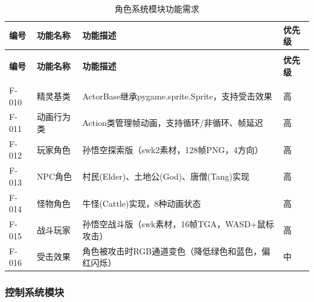 \documentclass[12pt,a4paper]{article}
\begin{document}
\begin{longtable}{>{\centering\arraybackslash}m{1.5cm}>{\centering\arraybackslash}m{2.5cm}>{\centering\arraybackslash}m{6cm}>{\centering\arraybackslash}m{1.5cm}}
\caption{角色系统模块功能需求} \label{tab:f_actor} \\
\toprule
\textbf{编号} & \textbf{功能名称} & \textbf{功能描述} & \textbf{优先级} \\
\midrule
\endfirsthead

\toprule
\multicolumn{4}{l}{续表} \\
\textbf{编号} & \textbf{功能名称} & \textbf{功能描述} & \textbf{优先级} \\
\midrule
\endhead

\midrule
\multicolumn{4}{r}{续下页} \\
\endfoot

\bottomrule
\endlastfoot

F-010 & 精灵基类 & ActorBase继承pygame.sprite.Sprite，支持受击效果 & 高 \\
F-011 & 动画行为类 & Action类管理帧动画，支持循环/非循环、帧延迟 & 高 \\
F-012 & 玩家角色 & 孙悟空探索版（swk2素材，128帧PNG，4方向） & 高 \\
F-013 & NPC角色 & 村民(Elder)、土地公(God)、唐僧(Tang)实现 & 高 \\
F-014 & 怪物角色 & 牛怪(Cattle)实现，8种动画状态 & 高 \\
F-015 & 战斗玩家 & 孙悟空战斗版（swk素材，16帧TGA，WASD+鼠标攻击） & 高 \\
F-016 & 受击效果 & 角色被攻击时RGB通道变色（降低绿色和蓝色，偏红闪烁） & 中 \\
\end{longtable}

\subsubsection{控制系统模块}
\end{document}
